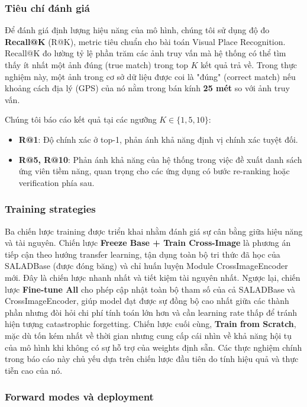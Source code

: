 \documentclass[12pt,a4paper]{article}
\begin{document}
    \subsubsection{Tiêu chí đánh giá}

    Để đánh giá định lượng hiệu năng của mô hình, chúng tôi sử dụng độ đo \textbf{Recall@K} (R@K), metric tiêu chuẩn cho bài toán Visual Place Recognition. Recall@K đo lường tỷ lệ phần trăm các ảnh truy vấn mà hệ thống có thể tìm thấy ít nhất một ảnh đúng (true match) trong top $K$ kết quả trả về. Trong thực nghiệm này, một ảnh trong cơ sở dữ liệu được coi là "đúng" (correct match) nếu khoảng cách địa lý (GPS) của nó nằm trong bán kính \textbf{25 mét} so với ảnh truy vấn.

    Chúng tôi báo cáo kết quả tại các ngưỡng $K \in \{1, 5, 10\}$:
    \begin{itemize}
        \item \textbf{R@1}: Độ chính xác ở top-1, phản ánh khả năng định vị chính xác tuyệt đối.
        \item \textbf{R@5, R@10}: Phản ánh khả năng của hệ thống trong việc đề xuất danh sách ứng viên tiềm năng, quan trọng cho các ứng dụng có bước re-ranking hoặc verification phía sau.
    \end{itemize}

    \subsubsection{Training strategies}

    Ba chiến lược training được triển khai nhằm đánh giá sự cân bằng giữa hiệu năng và tài nguyên. Chiến lược \textbf{Freeze Base + Train Cross-Image} là phương án tiếp cận theo hướng transfer learning, tận dụng toàn bộ tri thức đã học của SALADBase (được đóng băng) và chỉ huấn luyện Module CrossImageEncoder mới. Đây là chiến lược nhanh nhất và tiết kiệm tài nguyên nhất. Ngược lại, chiến lược \textbf{Fine-tune All} cho phép cập nhật toàn bộ tham số của cả SALADBase và CrossImageEncoder, giúp model đạt được sự đồng bộ cao nhất giữa các thành phần nhưng đòi hỏi chi phí tính toán lớn hơn và cần learning rate thấp để tránh hiện tượng catastrophic forgetting. Chiến lược cuối cùng, \textbf{Train from Scratch}, mặc dù tốn kém nhất về thời gian nhưng cung cấp cái nhìn về khả năng hội tụ của mô hình khi không có sự hỗ trợ của weights định sẵn. Các thực nghiệm chính trong báo cáo này chủ yếu dựa trên chiến lược đầu tiên do tính hiệu quả và thực tiễn cao của nó.

    \subsubsection{Forward modes và deployment}
\end{document}
